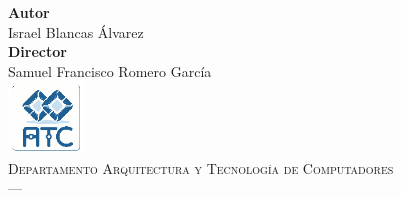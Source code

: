 \begin{titlepage}
\begin{minipage}{\textwidth}
\textbf{Autor}\\ {Israel Blancas Álvarez}\\[2.5ex]
\textbf{Director}\\
{Samuel Francisco Romero García}\\[2.5cm]
\includegraphics[width=0.15\textwidth]{imagenes/atc.png}\\[0.1cm]
\textsc{Departamento Arquitectura y Tecnología de Computadores}\\
\textsc{---}\\
\end{minipage}
\addtolength{\textwidth}{\centeroffset}


\end{titlepage}
